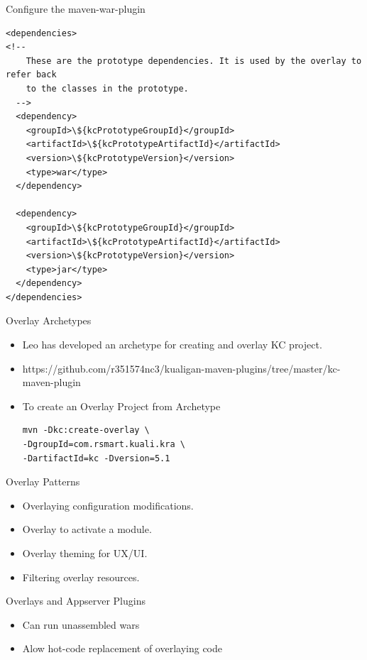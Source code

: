\documentclass[xcolor=dvipsnames,14pt,professionalfonts]{beamer}
\begin{document}
\begin{frame}[fragile]{Configure the maven-war-plugin}
  \begin{verbatim}
<dependencies>
<!--
    These are the prototype dependencies. It is used by the overlay to refer back
    to the classes in the prototype.
  -->
  <dependency>
    <groupId>\${kcPrototypeGroupId}</groupId>
    <artifactId>\${kcPrototypeArtifactId}</artifactId>
    <version>\${kcPrototypeVersion}</version>
    <type>war</type>
  </dependency>
  
  <dependency>
    <groupId>\${kcPrototypeGroupId}</groupId>
    <artifactId>\${kcPrototypeArtifactId}</artifactId>
    <version>\${kcPrototypeVersion}</version>
    <type>jar</type>
  </dependency>
</dependencies>
  \end{verbatim}
\end{frame}

\begin{frame}[fragile]{Overlay Archetypes}
  \begin{itemize}
  \item Leo has developed an archetype for creating and overlay KC project.
  \item https://github.com/r351574nc3/kualigan-maven-plugins/tree/master/kc-maven-plugin
  \item To create an Overlay Project from Archetype
  \begin{verbatim}
mvn -Dkc:create-overlay \
-DgroupId=com.rsmart.kuali.kra \
-DartifactId=kc -Dversion=5.1
  \end{verbatim}
  \end{itemize}
\end{frame}

\begin{frame}{Overlay Patterns}
  \begin{itemize}
    \item Overlaying configuration modifications.
    \item Overlay to activate a module.
    \item Overlay theming for UX/UI.
    \item Filtering overlay resources.
  \end{itemize}
\end{frame}

\begin{frame}[fragile]{Overlays and Appserver Plugins}
\begin{itemize}
\item Can run unassembled wars
\item Alow hot-code replacement of overlaying code
\end{itemize}
\end{frame}
\end{document}
